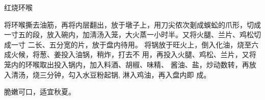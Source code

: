 \begin{recipe}{红烧环喉}

\ingredients


\cooking

\step 将环喉撕去油筋，再将内层翻出，放于墩子上，用刀尖侬次剗成蜈蚣的爪形，切成
一寸五的段，放入碗内，加淸汤入笼，大火蒸一小时半。又将火腿、兰片、鸡松切成一寸
二长、五分宽的片，放于盘内待用。
\step 将锅放于旺火上，倒入化油，烧至六成火候，将葱、姜投入油锅，稍炸，打去不
用，再投入火腿、鸡松、兰片，又将笼内的环喉取出投入锅内，加入料酒、胡椒、味精、
酱油、盐，炒动数转，再放入清汤，烧三分钟，勾入水豆粉起锅, 淋入鸡油，再入盘内即
成。

\notes

脆嫩可口，适宜秋夏。

\end{recipe}

